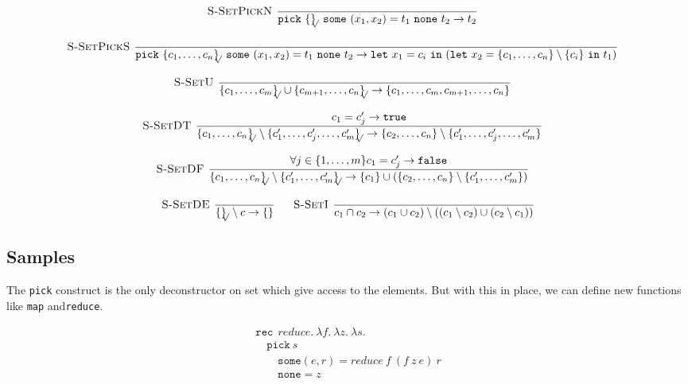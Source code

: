 \documentclass[a4paper]{article}
\newcommand{\code}[1]{{\tt #1}}
\newcommand{\s}[1]{\mathtt{#1}}
\newcommand{\sLb}{\s{\{}}
\newcommand{\sRb}{\s{\}}}
\newcommand{\spick}[3]{\s{pick}\ #1\ \s{some}\ #2\ \s{none}\ #3}
\newcommand{\sletin}[2]{\s{let\ } #1 \s{\ in\ } #2}
\newcommand{\srec}{\s{rec\ }}
\newcommand{\strue}{\s{true}}
\newcommand{\sfalse}{\s{false}}
\newcommand{\sset}[1]{\sLb #1 \sRb}
\newcommand{\ssetc}[1]{\sset{#1}_{\!\!\!\surd}}
\newcommand{\step}{\to}
\newcommand{\dotset}[2]{\{#1,\ldots,#2\}}
\renewcommand{\rule}[3][]{\ \mbox{\textsc{#1 }}\dfrac{#2}{#3}\ }
\begin{document}
\[\begin{array}{c}
\rule[S-SetPickN]{}{\spick{\ssetc{}}{(x_1,x_2) = t_1}{t_2} \step t_2}
\quad\\\\
\rule[S-SetPickS]{}{\spick{\ssetc{c_1,\ldots,c_n}}{(x_1,x_2) = t_1}{t_2} \step \sletin{x_1 = c_i}{(\sletin{x_2 = \sset{c_1,\ldots,c_n}\setminus\sset{c_i}}{t_1}})}
\quad\\\\
\rule[S-SetU]{}{\ssetc{c_1,\ldots,c_m} \cup \ssetc{c_{m+1},\ldots,c_n} \step
\{c_1,\ldots,c_m,c_{m+1},\ldots,c_n\}}
\quad\\\\
\rule[S-SetDT]{c_1 = c'_j \step \strue}
{\ssetc{c_1,\ldots,c_n} \setminus \ssetc{c'_1,\ldots,c'_j,\ldots,c'_m} \step
  \sset{c_2,\ldots,c_n} \setminus \sset{c'_1,\ldots,c'_j,\ldots,c'_m}
}
\quad\\\\
\rule[S-SetDF]{\forall j \in \dotset{1}{m} c_1 = c'_j \step \sfalse}
{\ssetc{c_1,\ldots,c_n} \setminus \ssetc{c'_1,\ldots,c'_m} \step
  \sset{c_1} \cup (\sset{c_2,\ldots,c_n} \setminus \sset{c'_1,\ldots,c'_m})
}
\quad\\\\
\rule[S-SetDE]{}{\ssetc{} \setminus c \step \sset{}}
\quad
\rule[S-SetI]{}{c_1 \cap c_2 \step (c_1 \cup c_2) \setminus ((c_1 \setminus c_2) \cup (c_2 \setminus c_1))}
\end{array}\]


\subsection{Samples}

The \code{pick} construct is the only deconstructor on set which give access to the elements. But with this in place, we can define new functions like \code{map} and\code{reduce}. 

\[\begin{array}{l}
\srec \  reduce.\ \lambda f.\ \lambda z.\ \lambda s.\\
\quad \s{pick} \ s \\
\quad\quad \s{some} (e,r) = reduce \ f \ (f \  z \  e)\ r\\
\quad\quad \s{none} = z
\end{array}\]
\end{document}
